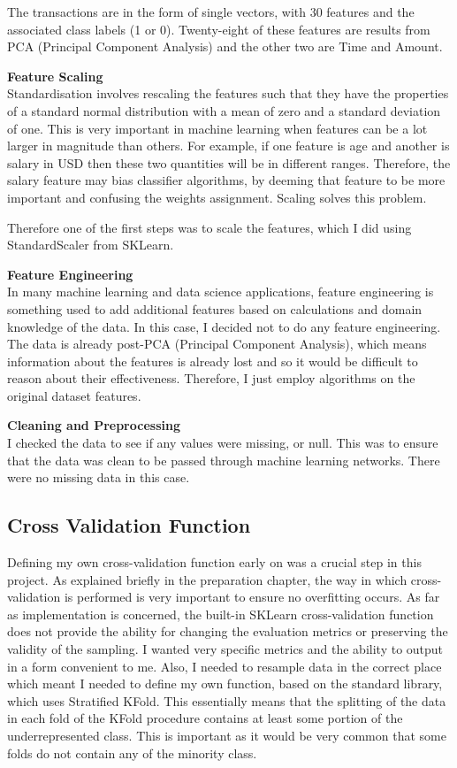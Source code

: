 \documentclass[12pt,a4paper,twoside]{report}
\begin{document}
The transactions are in the form of single vectors, with 30 features and the associated class labels (1 or 0). Twenty-eight of these features are results from PCA (Principal Component Analysis) and the other two are Time and Amount. 

\textbf{Feature Scaling}\\

Standardisation involves rescaling the features such that they have the properties of a standard normal distribution with a mean of zero and a standard deviation of one. This is very important in machine learning when features can be a lot larger in magnitude than others. For example, if one feature is age and another is salary in USD then these two quantities will be in different ranges. Therefore, the salary feature may bias classifier algorithms, by deeming that feature to be more important and confusing the weights assignment. Scaling solves this problem. 

Therefore one of the first steps was to scale the features, which I did using StandardScaler from SKLearn. 

\textbf{Feature Engineering}\\

In many machine learning and data science applications, feature engineering is something used to add additional features based on calculations and domain knowledge of the data. In this case, I decided not to do any feature engineering. The data is already post-PCA (Principal Component Analysis), which means information about the features is already lost and so it would be difficult to reason about their effectiveness. Therefore, I just employ algorithms on the original dataset features.

\textbf{Cleaning and Preprocessing}\\

I checked the data to see if any values were missing, or null. This was to ensure that the data was clean to be passed through machine learning networks. There were no missing data in this case.

\subsection{Cross Validation Function}

Defining my own cross-validation function early on was a crucial step in this project. As explained briefly in the preparation chapter, the way in which cross-validation is performed is very important to ensure no overfitting occurs. As far as implementation is concerned, the built-in SKLearn cross-validation function does not provide the ability for changing the evaluation metrics or preserving the validity of the sampling. I wanted very specific metrics and the ability to output in a form convenient to me. Also, I needed to resample data in the correct place which meant I needed to define my own function, based on the standard library, which uses Stratified KFold. This essentially means that the splitting of the data in each fold of the KFold procedure contains at least some portion of the underrepresented class. This is important as it would be very common that some folds do not contain any of the minority class. 
\end{document}
